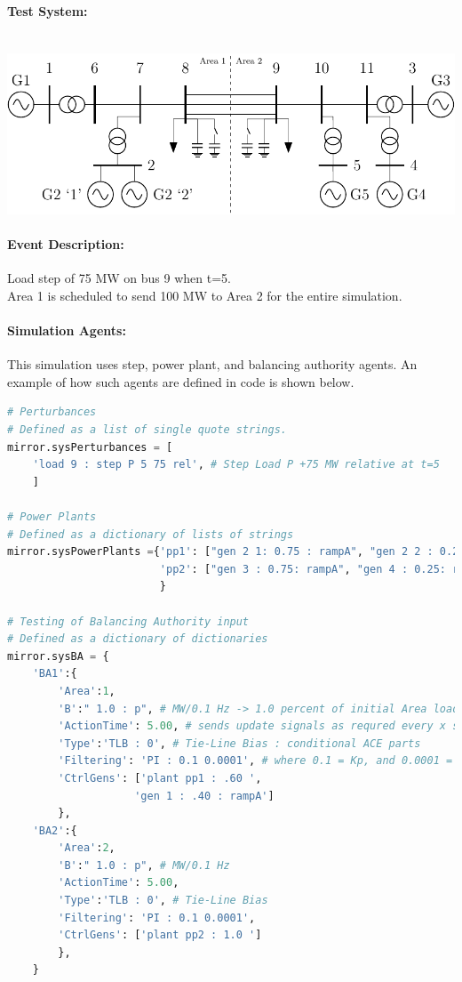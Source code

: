 \documentclass[12pt]{article}
\begin{document}
\paragraph{Test System:} \ \\
\includegraphics[width=\linewidth]{../../models/sixMachine/sixMachine}
\paragraph{Event Description:} Load step of 75 MW on bus 9 when t=5. \\Area 1 is scheduled to send 100 MW to Area 2 for the entire simulation.
\paragraph{Simulation Agents:}
This simulation uses step, power plant, and balancing authority agents. An example of how such agents are defined in code is shown below.
\begin{lstlisting}[language=Python]
# Perturbances
# Defined as a list of single quote strings.
mirror.sysPerturbances = [
    'load 9 : step P 5 75 rel', # Step Load P +75 MW relative at t=5
    ]

# Power Plants
# Defined as a dictionary of lists of strings
mirror.sysPowerPlants ={'pp1': ["gen 2 1: 0.75 : rampA", "gen 2 2 : 0.25: rampA"],
                        'pp2': ["gen 3 : 0.75: rampA", "gen 4 : 0.25: rampA"],
                        }

# Testing of Balancing Authority input
# Defined as a dictionary of dictionaries
mirror.sysBA = {
    'BA1':{
        'Area':1,
        'B':" 1.0 : p", # MW/0.1 Hz -> 1.0 percent of initial Area load
        'ActionTime': 5.00, # sends update signals as requred every x seconds
        'Type':'TLB : 0', # Tie-Line Bias : conditional ACE parts
        'Filtering': 'PI : 0.1 0.0001', # where 0.1 = Kp, and 0.0001 = a = Ki/Kp
        'CtrlGens': ['plant pp1 : .60 ',
                    'gen 1 : .40 : rampA']
        },
    'BA2':{
        'Area':2,
        'B':" 1.0 : p", # MW/0.1 Hz
        'ActionTime': 5.00,
        'Type':'TLB : 0', # Tie-Line Bias
        'Filtering': 'PI : 0.1 0.0001',
        'CtrlGens': ['plant pp2 : 1.0 ']
        },
    }
\end{lstlisting}
\end{document}
